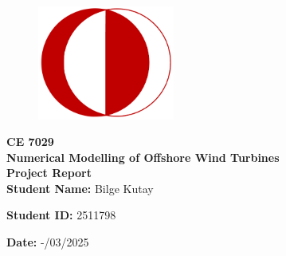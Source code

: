 \documentclass[a4paper]{article}
\begin{document}
\thispagestyle{empty}

\begin{figure}[H]
    \vspace{2.5cm} %
    \centering
    \includegraphics[width=0.4\textwidth]{logo.png}
\end{figure}
\vspace{1cm}

\begin{center}
    \textbf{\LARGE CE 7029}\\
    \vspace{0.3cm}
    \textbf{\LARGE Numerical Modelling of Offshore Wind Turbines}\\
    \vspace{0.5cm}
    \textbf{\Large Project Report}\\
    \vspace{0.8cm}
    \textbf{\large Student Name: }\large Bilge Kutay
    
    \textbf{\large Student ID: }\large 2511798
    \vspace{0.8cm}

    \textbf{\large Date: }\large -/03/2025
\end{center}
\end{document}
